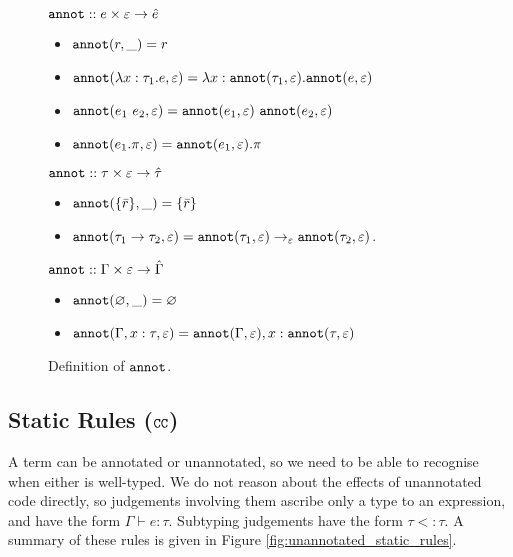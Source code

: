 \begin{figure}
\vspace{-0.2cm}

$\mathtt{annot} :: e \times \varepsilon \rightarrow \hat e$

\begin{itemize}
	\setlength\itemsep{-0.2em}
	\item[] $\mathtt{annot}(r, \_) = r$
	\item[] $\mathtt{annot}(\lambda x: \tau_1 . e, \varepsilon) = \lambda x: \mathtt{annot}(\tau_1, \varepsilon) . \mathtt{annot}(e, \varepsilon)$
	\item[] $\mathtt{annot}(e_1~e_2, \varepsilon) = \mathtt{annot}(e_1, \varepsilon)~\mathtt{annot}(e_2, \varepsilon)$
	\item[] $\mathtt{annot}(e_1.\pi, \varepsilon) = \mathtt{annot}(e_1, \varepsilon).\pi$
\end{itemize}
	
$\mathtt{annot} :: \tau \times \varepsilon \rightarrow \hat \tau$

\begin{itemize}
	\setlength\itemsep{-0.2em}
	\item[] $\mathtt{annot}(\{ \bar r \}, \_) = \{ \bar r \}$
	\item[] $\mathtt{annot}(\tau_1 \rightarrow \tau_2, \varepsilon) = \mathtt{annot}(\tau_1, \varepsilon) \rightarrow_{\varepsilon} \mathtt{annot}(\tau_2, \varepsilon)$.	
\end{itemize}

$\mathtt{annot} :: \Gamma \times \varepsilon \rightarrow \hat \Gamma$

\begin{itemize}
	\setlength\itemsep{-0.2em}
	\item[] $\mathtt{annot}(\varnothing, \_) = \varnothing$
	\item[] $\mathtt{annot}(\Gamma, x: \tau, \varepsilon) = \mathtt{annot}(\Gamma, \varepsilon), x: \mathtt{annot}(\tau, \varepsilon)$
\end{itemize}
\vspace{-0.5cm}
\caption{Definition of $\mathtt{annot}$.}
\vspace{-0.5cm}
\label{fig:annot_defn}
\end{figure}

\subsection{Static Rules ($\mathtt{CC}$)}

A term can be annotated or unannotated, so we need to be able to
recognise when either is well-typed. We do not reason about the
effects of unannotated code directly, so judgements involving them
ascribe only a type to an expression, and have the form $\Gamma \vdash e: \tau$.
Subtyping judgements have the form $\tau <: \tau$. A summary of these
rules is given in Figure \ref{fig:unannotated_static_rules}.

